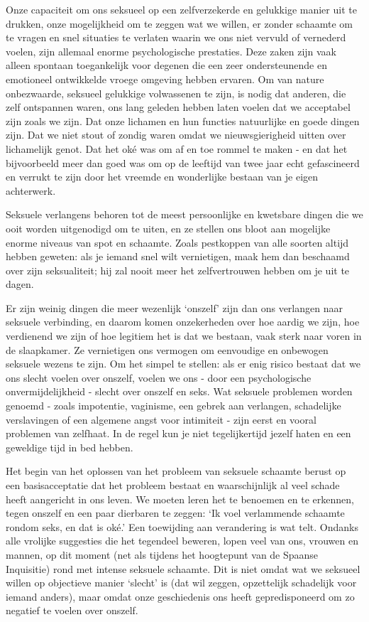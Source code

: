 Onze capaciteit om ons seksueel op een zelfverzekerde en gelukkige manier uit te drukken, onze mogelijkheid om te zeggen wat we willen, er zonder schaamte om te vragen en snel situaties te verlaten waarin we ons niet vervuld of vernederd voelen, zijn allemaal enorme psychologische prestaties. Deze zaken zijn vaak alleen spontaan toegankelijk voor degenen die een zeer ondersteunende en emotioneel ontwikkelde vroege omgeving hebben ervaren. Om van nature onbezwaarde, seksueel gelukkige volwassenen te zijn, is nodig dat anderen, die zelf ontspannen waren, ons lang geleden hebben laten voelen dat we acceptabel zijn zoals we zijn. Dat onze lichamen en hun functies natuurlijke en goede dingen zijn. Dat we niet stout of zondig waren omdat we nieuwsgierigheid uitten over lichamelijk genot. Dat het oké was om af en toe rommel te maken - en dat het bijvoorbeeld meer dan goed was om op de leeftijd van twee jaar echt gefascineerd en verrukt te zijn door het vreemde en wonderlijke bestaan van je eigen achterwerk.

Seksuele verlangens behoren tot de meest persoonlijke en kwetsbare dingen die we ooit worden uitgenodigd om te uiten, en ze stellen ons bloot aan mogelijke enorme niveaus van spot en schaamte. Zoals pestkoppen van alle soorten altijd hebben geweten: als je iemand snel wilt vernietigen, maak hem dan beschaamd over zijn seksualiteit; hij zal nooit meer het zelfvertrouwen hebben om je uit te dagen.

Er zijn weinig dingen die meer wezenlijk ‘onszelf’ zijn dan ons verlangen naar seksuele verbinding, en daarom komen onzekerheden over hoe aardig we zijn, hoe verdienend we zijn of hoe legitiem het is dat we bestaan, vaak sterk naar voren in de slaapkamer. Ze vernietigen ons vermogen om eenvoudige en onbewogen seksuele wezens te zijn. Om het simpel te stellen: als er enig risico bestaat dat we ons slecht voelen over onszelf, voelen we ons - door een psychologische onvermijdelijkheid - slecht over onszelf en seks. Wat seksuele problemen worden genoemd - zoals impotentie, vaginisme, een gebrek aan verlangen, schadelijke verslavingen of een algemene angst voor intimiteit - zijn eerst en vooral problemen van zelfhaat. In de regel kun je niet tegelijkertijd jezelf haten en een geweldige tijd in bed hebben.

Het begin van het oplossen van het probleem van seksuele schaamte berust op een basisacceptatie dat het probleem bestaat en waarschijnlijk al veel schade heeft aangericht in ons leven. We moeten leren het te benoemen en te erkennen, tegen onszelf en een paar dierbaren te zeggen: ‘Ik voel verlammende schaamte rondom seks, en dat is oké.’ Een toewijding aan verandering is wat telt. Ondanks alle vrolijke suggesties die het tegendeel beweren, lopen veel van ons, vrouwen en mannen, op dit moment (net als tijdens het hoogtepunt van de Spaanse Inquisitie) rond met intense seksuele schaamte. Dit is niet omdat wat we seksueel willen op objectieve manier ‘slecht’ is (dat wil zeggen, opzettelijk schadelijk voor iemand anders), maar omdat onze geschiedenis ons heeft gepredisponeerd om zo negatief te voelen over onszelf.

